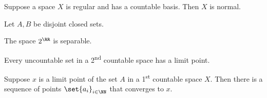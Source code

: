 \documentclass{fkpset}
\begin{document}

  \begin{problem}[5.32]
    Suppose a space $X$ is regular and has a countable basis. Then $X$
    is normal.
  \end{problem}
  \begin{solution}
    Let $A,B$ be disjoint closed sets.
  \end{solution}
  \clearpage

  \begin{problem}[6.6]
    The space $2^\RR$ is separable.
  \end{problem}
  \begin{solution}
  \end{solution}
  \clearpage

  \begin{problem}[6.11]
    Every uncountable set in a 2\textsuperscript{nd} countable space
    has a limit point.
  \end{problem}
  \begin{solution}
  \end{solution}
  \clearpage

  \begin{problem}[6.18]
    Suppose $x$ is a limit point of the set $A$ in a
    1\textsuperscript{st} countable space $X$. Then there is a
    sequence of points $\set{a_i}_{i \in \NN}$ that converges to $x$.
  \end{problem}
  \begin{solution}
  \end{solution}
\end{document}

